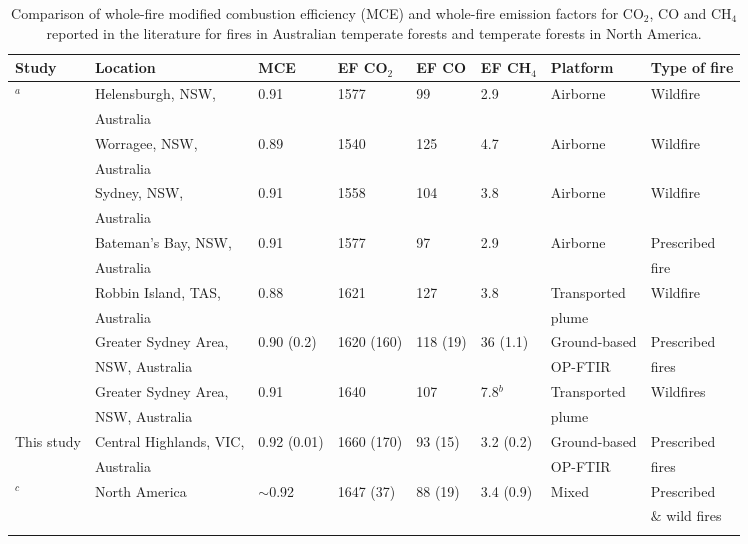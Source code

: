 \documentclass[acp, manuscript]{copernicus}
\begin{document}
\begin{table}
 \caption{Comparison of whole-fire modified combustion efficiency (MCE) and whole-fire emission factors for CO$_2$, CO and CH$_4$ reported in the literature for fires in Australian temperate forests and temperate forests in North America.}
 \begin{tabular}{l l l l l l l l } 
   \tophline
   Study & Location & MCE & EF CO$_2$ & EF CO & EF CH$_4$ & Platform & Type of fire \\ 
   \hline
   \citet{Hurst1996}$^a$ & Helensburgh, NSW, & 0.91 & 1577 & 99&2.9 & Airborne & Wildfire\\
   &Australia &&&&&&\\ 
   & Worragee, NSW,& 0.89 & 1540 & 125 & 4.7 & Airborne & Wildfire \\
   &Australia &&&&&&\\ 
   & Sydney, NSW, & 0.91 & 1558 & 104 & 3.8 & Airborne & Wildfire \\
   & Australia &&&&&&\\ 
   & Bateman's Bay, NSW,& 0.91 & 1577 & 97 &2.9 & Airborne & Prescribed  \\
   & Australia &&&&&& fire\\ 
  \citet{Lawson2015} & Robbin Island, TAS, & 0.88 & 1621 & 127 &3.8 & Transported  & Wildfire \\
  & Australia & & & & & plume & \\
  \citet{Paton-Walsh2014} & Greater Sydney Area, & 0.90 (0.2) & 1620 (160) & 118 (19) & 36 (1.1) & Ground-based  & Prescribed \\
      &  NSW, Australia& & & & & OP-FTIR& fires \\
   \citet{Rea2016} & Greater Sydney Area, & 0.91 & 1640& 107& 7.8$^b$& Transported  & Wildfires \\
     & NSW, Australia& & & & & plume& \\   
   This study & Central Highlands, VIC, & 0.92 (0.01) & 1660 (170) & 93 (15) & 3.2 (0.2) & Ground-based & Prescribed  \\
     &Australia & & & & & OP-FTIR & fires\\
   \citet{Akagi2011}$^c$ & North America & $\sim$0.92 & 1647 (37) & 88 (19) & 3.4 (0.9) & Mixed & Prescribed \\ 
  & & & & & & &  $\&$ wild fires \\ 
 \bottomhline
 \end{tabular}
 \label{table:MCE_comp}
\end{table}
\end{document}
